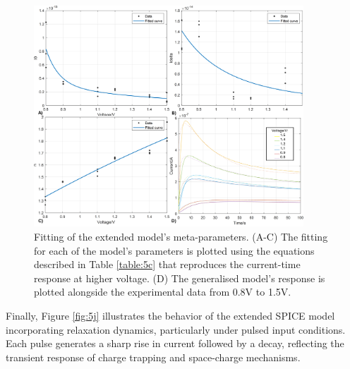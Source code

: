 \begin{figure}[htbp!] 
    \centering    
    \includegraphics[width=0.9\textwidth]{Chapter5/Figs/i.png}
    \caption[Fitting of the extended model's meta-parameters.]{Fitting of the extended model's meta-parameters. (A-C) The fitting for each of the model's parameters is plotted using the equations described in Table \ref{table:5c} that reproduces the current-time response at higher voltage. (D) The generalised model's response is plotted alongside the experimental data from 0.8V to 1.5V.}
    \label{fig:5i}
\end{figure}

\noindent Finally, Figure \ref{fig:5j} illustrates the behavior of the extended SPICE model incorporating relaxation dynamics, particularly under pulsed input conditions. Each pulse generates a sharp rise in current followed by a decay, reflecting the transient response of charge trapping and space-charge mechanisms.\\

